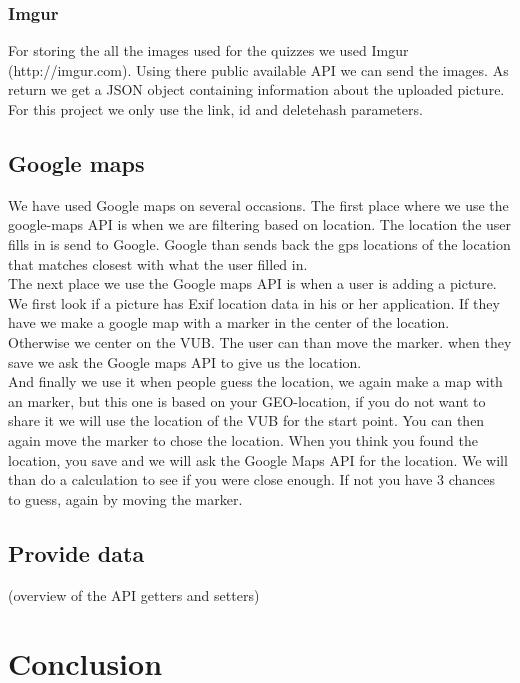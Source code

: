 \documentclass[11pt, oneside]{article}   	%
\begin{document}
\subsubsection{Imgur}
For storing the all the images used for the quizzes we used Imgur (http://imgur.com). Using there public available API we can send the images. As return we get a JSON object containing information about the uploaded picture. For this project we only use the link, id and deletehash parameters.

\subsection{Google maps}
We have used Google maps on several occasions.
The first place where we use the google-maps API is when we are filtering based on location. The location the user fills in is send to Google. Google than sends back the gps locations of the location that matches closest with what the user filled in. \\

The next place we use the Google maps API is when a user is adding a picture. We first look if a picture has Exif location data in his or her application. If they have we make a google map with a marker in the center of the location. Otherwise we center on the VUB. The user can than move the marker. when they save we ask the Google maps API to give us the location. \\

And finally we use it when people guess the location, we again make a map with an marker, but this one is based on your GEO-location, if you do not want to share it we will use the location of the VUB for the start point. You can then again move the marker to chose the location. When you think you found the location, you save and we will ask the Google Maps API for the location. We will than do a calculation to see if you were close enough. If not you have 3 chances to guess, again by moving the marker. \\


\subsection{Provide data}
(overview of the API getters and setters)

\section{Conclusion}
\end{document}
